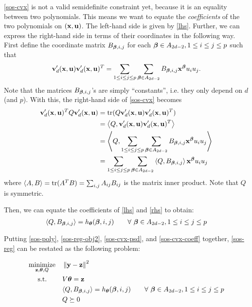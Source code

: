 \documentclass[11pt]{article}
\begin{document}
\eqref{sos-cvx} is not a valid semidefinite constraint yet, because it is an equality between two polynomials. This means we want to equate the \emph{coefficients} of the two polynomials on $({\bf x}, {\bf u})$. The left-hand side is given by \eqref{lhs}. Further, we can express the right-hand side in terms of their coordinates in the following way. First define the coordinate matrix $B_{{\boldsymbol\beta}, i, j}$ for each ${\boldsymbol\beta} \in A_{2d - 2}, 1 \le i \le j \le p$ such that
\[
{\bf v}_d'({\bf x}, {\bf u}) {\bf v}_d'({\bf x}, {\bf u})^T = \sum_{1 \le i \le j \le p}  \sum_{{\boldsymbol\beta} \in A_{2d - 2}} B_{{\boldsymbol\beta}, i, j} {\bf x}^{{\boldsymbol\beta}}  u_iu_j.
\]
Note that the matrices $B_{{\boldsymbol\beta}, i, j}$'s are simply ``constants'', i.e. they only depend on $d$ (and $p$). With this, the right-hand side of \eqref{sos-cvx} becomes
\begin{align}\label{rhs}
{\bf v}_d'({\bf x},{\bf u})^T Q {\bf v}_d'({\bf x},{\bf u}) &= \operatorname{tr}(Q {\bf v}_d'({\bf x}, {\bf u}) {\bf v}_d'({\bf x}, {\bf u})^T) \notag\\
&= \left\langle Q, {\bf v}_d'({\bf x}, {\bf u}) {\bf v}_d'({\bf x}, {\bf u})^T \right\rangle \notag\\
&= \left\langle Q, \sum_{1 \le i \le j \le p} \sum_{{\boldsymbol\beta} \in A_{2d - 2}} B_{{\boldsymbol\beta}, i, j} {\bf x}^{{\boldsymbol\beta}}  u_iu_j \right\rangle \notag\\
&= \sum_{1 \le i \le j \le p} \sum_{{\boldsymbol\beta} \in A_{2d - 2}} \left\langle Q, B_{{\boldsymbol\beta}, i, j} \right\rangle {\bf x}^{{\boldsymbol\beta}}  u_iu_j
\end{align}
where $\left\langle A,B \right\rangle = \operatorname{tr}(A^TB) = \sum_{i,j} A_{ij}B_{ij}$ is the  matrix inner product. Note that $Q$ is symmetric.

Then, we can equate the coefficients of \eqref{lhs} and \eqref{rhs} to obtain:
\begin{align}
\left\langle Q, B_{{\boldsymbol\beta}, i, j} \right\rangle = h_{\boldsymbol\theta}({\boldsymbol\beta}, i, j) \qquad \forall\ {\boldsymbol\beta} \in A_{2d - 2}, 1 \le i \le j \le p \label{sos-cvx-coeff}
\end{align}

Putting \eqref{sos-poly}, \eqref{sos-reg-obj2}, \eqref{sos-cvx-psd}, and \eqref{sos-cvx-coeff} together, \eqref{sos-reg} can be restated as the following problem:

\begin{equation}\label{sos-reg2}
\begin{aligned}
& \underset{{\bf z}, {\boldsymbol\theta}, Q}{\text{minimize}}
& & \left\lVert {\bf y}-{\bf z} \right\rVert^2 \\
& \text{\quad\ s.t.}
& &  V{\boldsymbol\theta} = {\bf z} \\
& & & \langle{Q, B_{{\boldsymbol\beta}, i, j}} \rangle = h_{\boldsymbol\theta}({\boldsymbol\beta}, i, j) \qquad \forall\ {\boldsymbol\beta} \in A_{2d - 2}, 1 \le i \le j \le p \\
& & & Q \succeq 0 
\end{aligned}
\end{equation}
\end{document}
